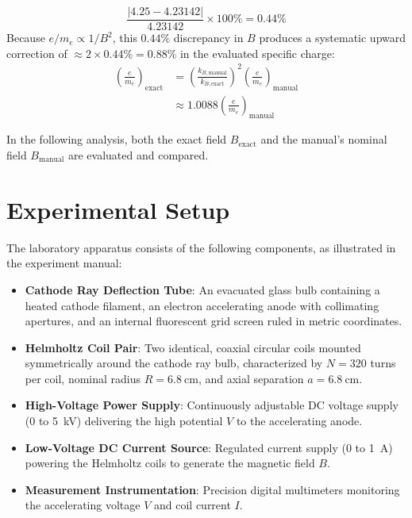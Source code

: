 \documentclass[journal]{IEEEtran}
\begin{document}
\begin{enumerate}
    \begin{equation}
        \frac{|4.25 - 4.23142|}{4.23142} \times 100\% = 0.44\%
    \end{equation}
    Because $e/m_e \propto 1/B^2$, this $0.44\%$ discrepancy in $B$ produces a systematic upward correction of $\approx 2 \times 0.44\% = 0.88\%$ in the evaluated specific charge:
    \begin{align}
        \left(\frac{e}{m_e}\right)_{\text{exact}} &= \left(\frac{k_{B,\text{manual}}}{k_{B,\text{exact}}}\right)^2 \left(\frac{e}{m_e}\right)_{\text{manual}} \nonumber \\
        &\approx 1.0088 \left(\frac{e}{m_e}\right)_{\text{manual}}
    \end{align}
\end{enumerate}
In the following analysis, both the exact field $B_{\text{exact}}$ and the manual's nominal field $B_{\text{manual}}$ are evaluated and compared.

\section{Experimental Setup}
The laboratory apparatus consists of the following components, as illustrated in the experiment manual:
\begin{itemize}
    \item \textbf{Cathode Ray Deflection Tube}: An evacuated glass bulb containing a heated cathode filament, an electron accelerating anode with collimating apertures, and an internal fluorescent grid screen ruled in metric coordinates.
    \item \textbf{Helmholtz Coil Pair}: Two identical, coaxial circular coils mounted symmetrically around the cathode ray bulb, characterized by $N = 320$ turns per coil, nominal radius $R = \SI{6.8}{\centi\meter}$, and axial separation $a = \SI{6.8}{\centi\meter}$.
    \item \textbf{High-Voltage Power Supply}: Continuously adjustable DC voltage supply ($0$ to \SI{5}{\kilo\volt}) delivering the high potential $V$ to the accelerating anode.
    \item \textbf{Low-Voltage DC Current Source}: Regulated current supply ($0$ to \SI{1}{\ampere}) powering the Helmholtz coils to generate the magnetic field $B$.
    \item \textbf{Measurement Instrumentation}: Precision digital multimeters monitoring the accelerating voltage $V$ and coil current $I$.
\end{itemize}
\end{document}
